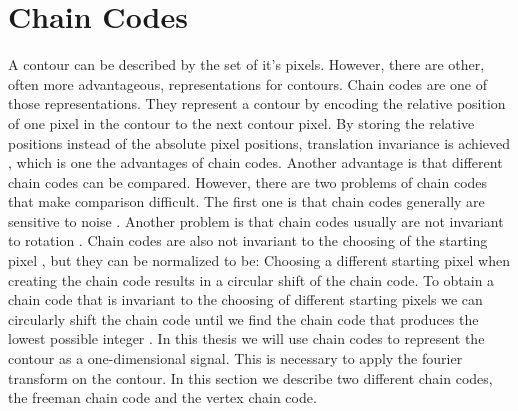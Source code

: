 \documentclass[thesis.tex]{subfiles}
\begin{document}
\section{Chain Codes} \label{chain_codes}
A contour can be described by the set of it's pixels. However, there are other, often more advantageous, representations for contours. Chain codes are one of those representations. They represent a contour by encoding the relative position of one pixel in the contour to the next contour pixel. By storing the relative positions instead of the absolute pixel positions, translation invariance is achieved \cite{yang2008su}, which is one the advantages of chain codes. Another advantage is that different chain codes can be compared. However, there are two problems of chain codes that make comparison difficult. The first one is that chain codes generally are sensitive to noise \cite{yang2008su}. Another problem is that chain codes usually are not invariant to rotation \cite{yang2008su}. Chain codes are also not invariant to the choosing of the starting pixel \cite{Ballard:1982:CV:578131}, but they can be normalized to be: Choosing a different starting pixel when creating the chain code results in a circular shift of the chain code. To obtain a chain code that is invariant to the choosing of different starting pixels we can circularly shift the chain code until we find the chain code that produces the lowest possible integer \cite{Ballard:1982:CV:578131}. In this thesis we will use chain codes to represent the contour as a one-dimensional signal. This is necessary to apply the fourier transform on the contour. In this section we describe two different chain codes, the freeman chain code and the vertex chain code.    
\end{document}
